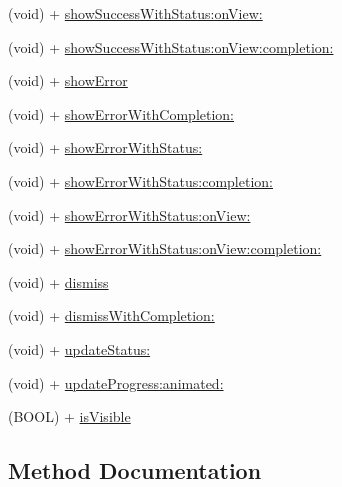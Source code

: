 \begin{DoxyCompactItemize}
\item 
(void) + \mbox{\hyperlink{interface_k_v_n_progress_a86fcdede3818f360abfae851a7b1b7fc}{show\+Success\+With\+Status\+:on\+View\+:}}
\item 
(void) + \mbox{\hyperlink{interface_k_v_n_progress_a622aa6249f5eafaa2b61058bfe2f2d61}{show\+Success\+With\+Status\+:on\+View\+:completion\+:}}
\item 
(void) + \mbox{\hyperlink{interface_k_v_n_progress_aca67ff95ae9a6d0ad5237fdc1d5dd34c}{show\+Error}}
\item 
(void) + \mbox{\hyperlink{interface_k_v_n_progress_a9de6833483cb5bd061d150e8fb42e5f8}{show\+Error\+With\+Completion\+:}}
\item 
(void) + \mbox{\hyperlink{interface_k_v_n_progress_a3125f228cdd6685e4cf74fa960bfa234}{show\+Error\+With\+Status\+:}}
\item 
(void) + \mbox{\hyperlink{interface_k_v_n_progress_a518bc804665bbc2a01905a6b4caf9459}{show\+Error\+With\+Status\+:completion\+:}}
\item 
(void) + \mbox{\hyperlink{interface_k_v_n_progress_a639e363838fbea785adea0aa9b39ca39}{show\+Error\+With\+Status\+:on\+View\+:}}
\item 
(void) + \mbox{\hyperlink{interface_k_v_n_progress_a6cc598f816de8d78d34ab7a9d2216512}{show\+Error\+With\+Status\+:on\+View\+:completion\+:}}
\item 
(void) + \mbox{\hyperlink{interface_k_v_n_progress_a4b11cd2b647d08b5c05cf79b99e3f588}{dismiss}}
\item 
(void) + \mbox{\hyperlink{interface_k_v_n_progress_a7ec9c844ebb26d0f9cdff6ef3d737d28}{dismiss\+With\+Completion\+:}}
\item 
(void) + \mbox{\hyperlink{interface_k_v_n_progress_ab50b37330761d25ce8b261290537da1a}{update\+Status\+:}}
\item 
(void) + \mbox{\hyperlink{interface_k_v_n_progress_a70c537364b9ea751af24178448335b98}{update\+Progress\+:animated\+:}}
\item 
(B\+O\+OL) + \mbox{\hyperlink{interface_k_v_n_progress_a28dddb521ec06e907b8cc436b34e71cb}{is\+Visible}}
\end{DoxyCompactItemize}


\subsection{Method Documentation}
\mbox{\label{interface_k_v_n_progress_aaba9484a867f6da9cb051da337161d15}} 
